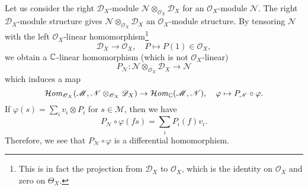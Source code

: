 Let us consider the right $\mathscr{D}_X$-module $\mathscr{N}\otimes_{\mathscr{O}_X}\mathscr{D}_X$ for an $\mathscr{O}_X$-module $\mathscr{N}$. The right $\mathscr{D}_X$-module structure gives $\mathscr{N}\otimes_{\mathscr{O}_X}\mathscr{D}_X$ an $\mathscr{O}_X$-module structure. By tensoring $\mathscr{N}$ with the left $\mathscr{O}_X$-linear homomorphism\footnote{This is in fact the projection from $\mathscr{D}_X$ to $\mathscr{O}_X$, which is the identity on $\mathscr{O}_X$ and zero on $\Theta_X$.}
\[\mathscr{D}_X\to\mathscr{O}_X,\quad P\mapsto P(1)\in\mathscr{O}_X,\]
we obtain a $\mathbb{C}$-linear homomorphism (which is not $\mathscr{O}_X$-linear)
\[P_\mathscr{N}:\mathscr{N}\otimes_{\mathscr{O}_X}\mathscr{D}_X\to\mathscr{N}\]
which induces a map
\[\operatorname{\mathcal{H}\hspace*{-0.4pt}\textit{om}\hspace{0.5pt}}_{\mathscr{O}_X}(\mathscr{M},\mathscr{N}\otimes_{\mathscr{O}_X}\mathscr{D}_X)\to \operatorname{\mathcal{H}\hspace*{-0.4pt}\textit{om}\hspace{0.5pt}}_{\mathbb{C}}(\mathscr{M},\mathscr{N}),\quad \varphi\mapsto P_\mathscr{N}\circ\varphi.\]
If $\varphi(s)=\sum_iv_i\otimes P_i$ for $s\in\mathscr{M}$, then we have
\[P_\mathscr{N}\circ\varphi(fs)=\sum_iP_i(f)v_i.\]
Therefore, we see that $P_\mathscr{N}\circ\varphi$ is a differential homomorphism.

